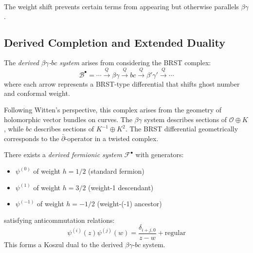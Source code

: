 The weight shift prevents certain terms from appearing but otherwise parallels $\beta\gamma$.
 
\subsection{Derived Completion and Extended Duality}

\begin{definition}\label{def:derived-bg-bc}
The \emph{derived $\beta\gamma$-$bc$ system} arises from considering the BRST complex:
\[
\mathcal{B}^{\bullet} = \cdots \xrightarrow{Q} \beta\gamma \xrightarrow{Q} bc \xrightarrow{Q} \beta'\gamma' \xrightarrow{Q} \cdots
\]
where each arrow represents a BRST-type differential that shifts ghost number and conformal weight.
\end{definition}

\begin{remark}
Following Witten's perspective, this complex arises from the geometry of holomorphic vector bundles 
on curves. The $\beta\gamma$ system describes sections of $\mathcal{O} \oplus K$, while $bc$ describes 
sections of $K^{-1} \oplus K^2$. The BRST differential geometrically corresponds to the 
$\bar{\partial}$-operator in a twisted complex.
\end{remark}

\begin{theorem}\label{thm:extended-ferm-ghost}
There exists a \emph{derived fermionic system} $\mathcal{F}^{\bullet}$ with generators:
\begin{itemize}
\item $\psi^{(0)}$ of weight $h = 1/2$ (standard fermion)
\item $\psi^{(1)}$ of weight $h = 3/2$ (weight-1 descendant)
\item $\psi^{(-1)}$ of weight $h = -1/2$ (weight-(-1) ancestor)
\end{itemize}
satisfying anticommutation relations:
\[
\psi^{(i)}(z)\psi^{(j)}(w) = \frac{\delta_{i+j,0}}{z-w} + \text{regular}
\]
This forms a Koszul dual to the derived $\beta\gamma$-$bc$ system.
\end{theorem}

